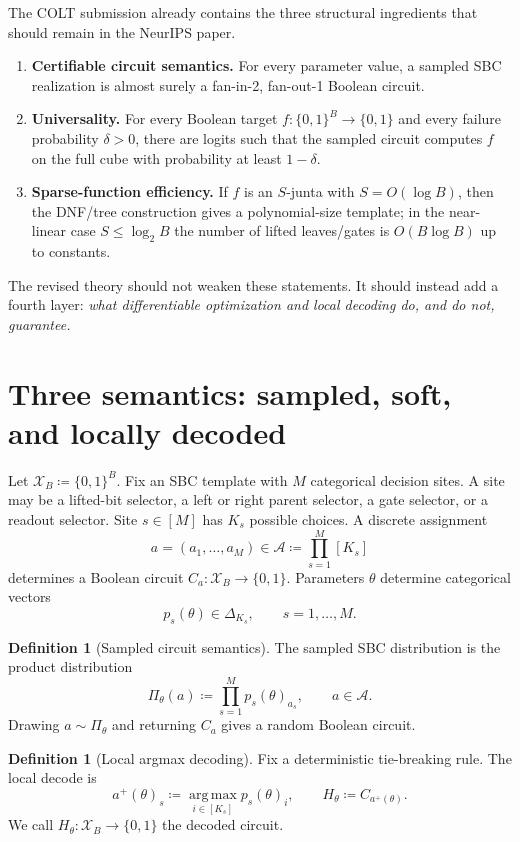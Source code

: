 \documentclass[11pt]{article}
\theoremstyle{definition}
\newtheorem{definition}[theorem]{Definition}
\theoremstyle{remark}
\newcommand{\X}{\mathcal X}
\newcommand{\A}{\mathcal A}
\newcommand{\argmax}{\operatorname*{arg\,max}}
\newcommand{\SBC}{\textnormal{\textsc{SBC}}}
\newcommand{\bits}{\{0,1\}}
\begin{document}
The COLT submission already contains the three structural ingredients that should remain in the NeurIPS paper.
\begin{enumerate}[leftmargin=1.4em]
\item \textbf{Certifiable circuit semantics.}  For every parameter value, a sampled \SBC{} realization is almost surely a fan-in-2, fan-out-1 Boolean circuit.
\item \textbf{Universality.}  For every Boolean target $f:\bits^B\to\bits$ and every failure probability $\delta>0$, there are logits such that the sampled circuit computes $f$ on the full cube with probability at least $1-\delta$.
\item \textbf{Sparse-function efficiency.}  If $f$ is an $S$-junta with $S=O(\log B)$, then the DNF/tree construction gives a polynomial-size template; in the near-linear case $S\le \log_2 B$ the number of lifted leaves/gates is $O(B\log B)$ up to constants.
\end{enumerate}

The revised theory should not weaken these statements.  It should instead add a fourth layer: \emph{what differentiable optimization and local decoding do, and do not, guarantee.}

\section{Three semantics: sampled, soft, and locally decoded}

Let $\X_B\coloneqq \bits^B$.  Fix an \SBC{} template with $M$ categorical decision sites.  A site may be a lifted-bit selector, a left or right parent selector, a gate selector, or a readout selector.  Site $s\in[M]$ has $K_s$ possible choices.  A discrete assignment
\[
    a=(a_1,\ldots,a_M)\in \A\coloneqq \prod_{s=1}^M [K_s]
\]
determines a Boolean circuit $C_a:\X_B\to\bits$.  Parameters $\theta$ determine categorical vectors
\[
    p_s(\theta)\in\Delta_{K_s},\qquad s=1,\ldots,M.
\]

\begin{definition}[Sampled circuit semantics]
The sampled \SBC{} distribution is the product distribution
\[
    \Pi_\theta(a)\coloneqq \prod_{s=1}^M p_s(\theta)_{a_s},
    \qquad a\in\A.
\]
Drawing $a\sim\Pi_\theta$ and returning $C_a$ gives a random Boolean circuit.
\end{definition}

\begin{definition}[Local argmax decoding]
Fix a deterministic tie-breaking rule.  The local decode is
\[
    a^+(\theta)_s\coloneqq \argmax_{i\in[K_s]} p_s(\theta)_i,
    \qquad
    H_\theta\coloneqq C_{a^+(\theta)}.
\]
We call $H_\theta:\X_B\to\bits$ the decoded circuit.
\end{definition}
\end{document}
